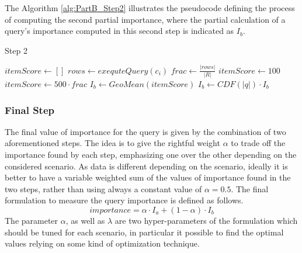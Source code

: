 The Algorithm \ref{alg:PartB_Step2} illustrates the pseudocode defining the process of computing the second partial importance, where the partial calculation of a query's importance computed in this second step is indicated as $I_b$. 

\begin{algorithm}[h]
    \caption{Step 2} 
    \begin{algorithmic}[1]
        \State $itemScore \gets []$
           
            \State $rows \gets exequteQuery(c_i)$
            \State $frac \gets \frac{|rows|}{|R|}$
               \State $itemScore \gets 100$
            \Else
                \State $itemScore \gets 500 \cdot frac$ 
            \EndIf
        \EndFor
        \State $I_b \gets GeoMean(itemScore)$
        \State $I_b \gets CDF(|q|) \cdot I_b$
    \end{algorithmic} 
    \label{alg:PartB_Step2}
\end{algorithm}

\subsubsection{Final Step}
The final value of importance for the query is given by the combination of two aforementioned steps. The idea is to give the rightful weight $\alpha$ to trade off the importance found by each step, emphasizing one over the other depending on the considered scenario. As data is different depending on the scenario, ideally it is better to have a variable weighted sum of the values of importance found in the two steps, rather than using always a constant value of $\alpha = 0.5$.
The final formulation to measure the query importance is defined as follows.
\begin{equation}\label{eq:QueryUtility_final}
    importance = \alpha \cdot  I_a + (1-\alpha) \cdot I_b
\end{equation}
The parameter $\alpha$, as well as $\lambda$ are two hyper-parameters of the formulation which should be tuned for each scenario, in particular it possible to find the optimal values relying on some kind of optimization technique.